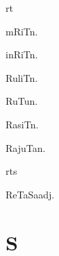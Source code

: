 \begin{multicols*}{2}
\begin{dictroot}{r}{t}
\begin{dictentry}{mRiT}{n.}
    \end{dictentry}
    \begin{dictentry}{inRiT}{n.}
    \end{dictentry}
    \begin{dictentry}{RuliT}{n.}
    \end{dictentry}
    \begin{dictentry}{RuTu}{n.}
    \end{dictentry}
    \begin{dictentry}{RasiT}{n.}
    \end{dictentry}
    \begin{dictentry}{RajuTa}{n.}
    \end{dictentry}
\end{dictroot}

\begin{dictroot}{rt}{s}
    \begin{dictentry}{ReTaSa}{adj.}
    \end{dictentry}
\end{dictroot}

\section*{S}


\end{multicols*}
